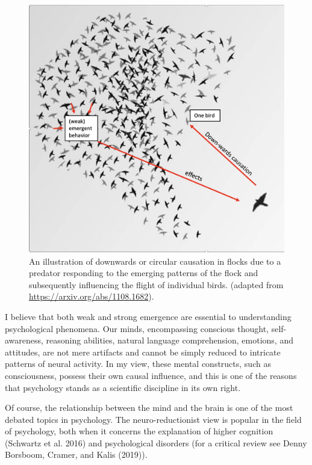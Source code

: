 \documentclass[
  a4paper,
  DIV=11,
  numbers=noendperiod,
  oneside]{scrreprt}
\begin{document}
\begin{figure}

{\centering \includegraphics{media/ch1/image4.jpg}

}

\caption{\label{fig-ch1-img4}An illustration of downwards or circular
causation in flocks due to a predator responding to the emerging
patterns of the flock and subsequently influencing the flight of
individual birds. (adapted from \url{https://arxiv.org/abs/1108.1682}).}

\end{figure}

I believe that both weak and strong emergence are essential to
understanding psychological phenomena. Our minds, encompassing conscious
thought, self-awareness, reasoning abilities, natural language
comprehension, emotions, and attitudes, are not mere artifacts and
cannot be simply reduced to intricate patterns of neural activity. In my
view, these mental constructs, such as consciousness, possess their own
causal influence, and this is one of the reasons that psychology stands
as a scientific discipline in its own right.

Of course, the relationship between the mind and the brain is one of the
most debated topics in psychology. The neuro-reductionist view is
popular in the field of psychology, both when it concerns the
explanation of higher cognition (Schwartz et al. 2016) and psychological
disorders (for a critical review see Denny Borsboom, Cramer, and Kalis
(2019)).
\end{document}
